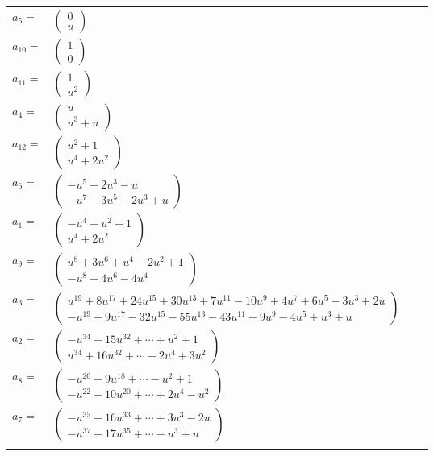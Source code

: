 \documentclass[1p]{elsarticle_modified}
\theoremstyle{definition}
\begin{document}
\begin{tabular}{m{7pt} m{180pt} m{7pt} m{180pt} }
\flushright $a_{5}=$&$\begin{pmatrix}0\\u\end{pmatrix}$ \\
\flushright $a_{10}=$&$\begin{pmatrix}1\\0\end{pmatrix}$ \\
\flushright $a_{11}=$&$\begin{pmatrix}1\\u^2\end{pmatrix}$ \\
\flushright $a_{4}=$&$\begin{pmatrix}u\\u^3+u\end{pmatrix}$ \\
\flushright $a_{12}=$&$\begin{pmatrix}u^2+1\\u^4+2 u^2\end{pmatrix}$ \\
\flushright $a_{6}=$&$\begin{pmatrix}- u^5-2 u^3- u\\- u^7-3 u^5-2 u^3+u\end{pmatrix}$ \\
\flushright $a_{1}=$&$\begin{pmatrix}- u^4- u^2+1\\u^4+2 u^2\end{pmatrix}$ \\
\flushright $a_{9}=$&$\begin{pmatrix}u^8+3 u^6+u^4-2 u^2+1\\- u^8-4 u^6-4 u^4\end{pmatrix}$ \\
\flushright $a_{3}=$&$\begin{pmatrix}u^{19}+8 u^{17}+24 u^{15}+30 u^{13}+7 u^{11}-10 u^9+4 u^7+6 u^5-3 u^3+2 u\\- u^{19}-9 u^{17}-32 u^{15}-55 u^{13}-43 u^{11}-9 u^9-4 u^5+u^3+u\end{pmatrix}$ \\
\flushright $a_{2}=$&$\begin{pmatrix}- u^{34}-15 u^{32}+\cdots+u^2+1\\u^{34}+16 u^{32}+\cdots-2 u^4+3 u^2\end{pmatrix}$ \\
\flushright $a_{8}=$&$\begin{pmatrix}- u^{20}-9 u^{18}+\cdots- u^2+1\\- u^{22}-10 u^{20}+\cdots+2 u^4- u^2\end{pmatrix}$ \\
\flushright $a_{7}=$&$\begin{pmatrix}- u^{35}-16 u^{33}+\cdots+3 u^3-2 u\\- u^{37}-17 u^{35}+\cdots- u^3+u\end{pmatrix}$\\&\end{tabular}
\end{document}
